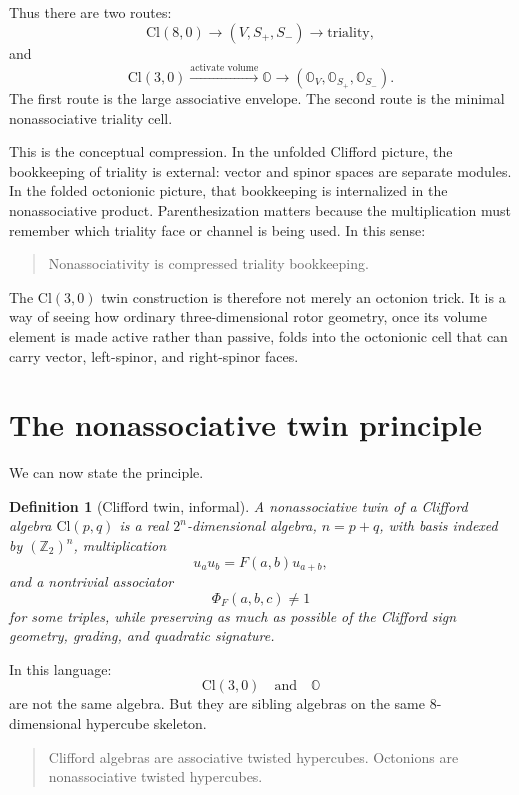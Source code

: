\documentclass[11pt]{article}
\newtheorem{definition}{Definition}
\newcommand{\Ztwo}{\mathbb Z_2}
\newcommand{\Cl}{\mathrm{Cl}}
\newcommand{\OO}{\mathbb O}
\newcommand{\assoc}{\Phi}
\begin{document}
Thus there are two routes:
\[
\Cl(8,0)
\longrightarrow
(V,S_+,S_-)
\longrightarrow
\text{triality},
\]
and
\[
\Cl(3,0)
\xrightarrow{\text{activate volume}}
\mathbb O
\longrightarrow
(\mathbb O_V,\mathbb O_{S_+},\mathbb O_{S_-}).
\]
The first route is the large associative envelope. The second route is the
minimal nonassociative triality cell.

This is the conceptual compression. In the unfolded Clifford picture, the
bookkeeping of triality is external: vector and spinor spaces are separate
modules. In the folded octonionic picture, that bookkeeping is internalized in
the nonassociative product. Parenthesization matters because the multiplication
must remember which triality face or channel is being used. In this sense:
\begin{quote}
Nonassociativity is compressed triality bookkeeping.
\end{quote}

The $\Cl(3,0)$ twin construction is therefore not merely an octonion trick. It
is a way of seeing how ordinary three-dimensional rotor geometry, once its
volume element is made active rather than passive, folds into the octonionic
cell that can carry vector, left-spinor, and right-spinor faces.

\section{The nonassociative twin principle}

We can now state the principle.

\begin{definition}[Clifford twin, informal]
A nonassociative twin of a Clifford algebra $\Cl(p,q)$ is a real
$2^n$-dimensional algebra, $n=p+q$, with basis indexed by $(\Ztwo)^n$,
multiplication
\[
u_a u_b = F(a,b)u_{a+b},
\]
and a nontrivial associator
\[
\assoc_F(a,b,c)\neq 1
\]
for some triples, while preserving as much as possible of the Clifford
sign geometry, grading, and quadratic signature.
\end{definition}

In this language:
\[
\Cl(3,0)
\quad\text{and}\quad
\OO
\]
are not the same algebra. But they are sibling algebras on the same
$8$-dimensional hypercube skeleton.

\begin{quote}
Clifford algebras are associative twisted hypercubes.
Octonions are nonassociative twisted hypercubes.
\end{quote}
\end{document}
